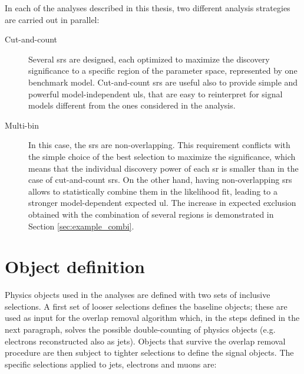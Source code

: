 In each of the analyses described in this thesis, two different analysis strategies are carried out in parallel:
\begin{description}
\item[Cut-and-count] Several \glspl{sr} are designed, each optimized to maximize the discovery significance to a specific region of the parameter  space, represented by one benchmark model. Cut-and-count \glspl{sr} are useful also to provide simple and powerful model-independent \glspl{ul}, that are easy to reinterpret for signal models different from the ones considered in the analysis. 

\item[Multi-bin] In this case, the \glspl{sr} are non-overlapping. This requirement conflicts with the simple choice of the best selection to maximize the significance, which means that the individual discovery power of each \gls{sr} is smaller than in the case of cut-and-count \glspl{sr}. On the other hand, having non-overlapping \glspl{sr} allows to statistically combine them in the likelihood fit, leading to a stronger model-dependent expected \gls{ul}. The increase in expected exclusion obtained with the combination of several regions is demonstrated in Section \ref{sec:example_combi}.
 
\end{description}


\section{Object definition}
\label{sec:common_obj_def}

Physics objects used in the analyses are defined with two sets of inclusive selections. 
A first set of looser selections defines the baseline objects; 
these are used as input for the overlap removal algorithm which, in the steps defined in the next paragraph,
solves the possible double-counting of physics objects (e.g. electrons reconstructed also as jets). 
Objects that survive the overlap removal procedure are then subject to 
tighter selections to define the signal objects. The specific selections applied to jets, electrons and muons are:


